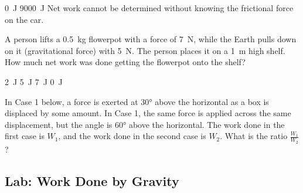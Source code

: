 \documentclass[]{exam}
\begin{document}
\begin{questions}
\begin{randomizechoices}[keeplast]
    \correctchoice \SI{0}{J}
    \choice \SI{9000}{J}
    \choice Net work cannot be determined without knowing the frictional force on the car.
\end{randomizechoices}

\question
A person lifts a \SI{0.5}{kg} flowerpot with a force of \SI{7}{N}, while the Earth pulls down on it (gravitational force) with \SI{5}{N}. The person places it on a \SI{1}{m} high shelf. How much net work was done getting the flowerpot onto the shelf?

\begin{randomizechoices}
    \correctchoice \SI{2}{J}
    \choice \SI{5}{J}
    \choice \SI{7}{J}
    \choice \SI{0}{J}
\end{randomizechoices}

\question
In Case 1 below, a force is exerted at \ang{30} above the horizontal as a box is displaced by some amount. In Case 1, the same force is applied across the same displacement, but the angle is \ang{60} above the horizontal. The work done in the first case is $W_1$, and the work done in the second case is $W_2$. What is the ratio $\frac{W_1}{W_2}$?

\begin{center}

\vspace{1em}

\end{center}

\end{questions}

\clearpage

\subsection*{Lab: Work Done by Gravity}
\end{document}
